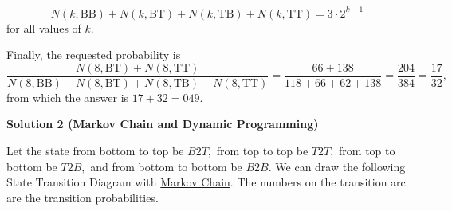 \begin{enumerate}
 \[N(k,\mathrm{BB})+N(k,\mathrm{BT})+N(k,\mathrm{TB})+N(k,\mathrm{TT})=3\cdot2^{k-1}\] for all values of $k.$

 Finally, the requested probability is 
 \[\frac{N(8,\mathrm{BT})+N(8,\mathrm{TT})}{N(8,\mathrm{BB})+N(8,\mathrm{BT})+N(8,\mathrm{TB})+N(8,\mathrm{TT})}=\frac{66+138}{118+66+62+138}=\frac{204}{384}=\frac{17}{32},\] from which the answer is $17+32=\boxed{049}.$




\textbf{Solution 2 (Markov Chain and Dynamic Programming)}

Let the state from bottom to top be $B2T,$ from top to top be $T2T,$ from top to bottom be $T2B,$ and from bottom to bottom be $B2B.$ We can draw the following State Transition Diagram with \href{https://en.wikipedia.org/wiki/Markov\_chain}{Markov Chain}. The numbers on the transition arc are the transition probabilities. 


\end{enumerate}
